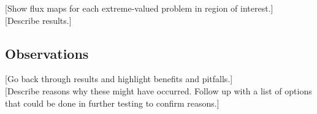 [Show flux maps for each extreme-valued problem in region of interest.] \\

[Describe results.] \\

\subsection{Observations}
\label{subsec:observations}

[Go back through results and highlight benefits and pitfalls.] \\

[Describe reasons why these might have occurred. Follow up with a list of options
that could be done in further testing to confirm reasons.] \\
